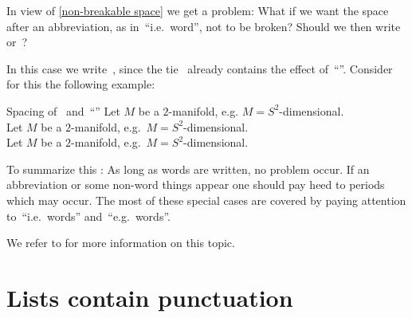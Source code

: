 In view of \cref{non-breakable space} we get a problem:
What if we want the space after an abbreviation, as in~\enquote{i.e.~word}, not to be broken?
Should we then write~ or~?

In this case we write~, since the tie~\inlinecode{\customtexttilde} already contains the effect of~\enquote{\inlinecode{{\tbs} }}.
Consider for this the following example:
\begin{showlatex}{Spacing of~\inlinecode{\customtexttilde} and~\enquote{\inlinecode{{\tbs} }}}
Let $M$ be a $2$-manifold, e.g. $M = S^2$-dimensional. \\
Let $M$ be a $2$-manifold, e.g.\ $M = S^2$-dimensional. \\
Let $M$ be a $2$-manifold, e.g.~$M = S^2$-dimensional.
\end{showlatex}

To summarize this :
As long as words are written, no problem occur.
If an abbreviation or some non-word things appear one should pay heed to periods which may occur.
The most of these special cases are covered by paying attention to~\enquote{i.e.~words} and~\enquote{e.g.~words}.

We refer to \cite[19.5.1, 19.6]{latex2e_manual} for more information on this topic.





\section{Lists contain punctuation}

